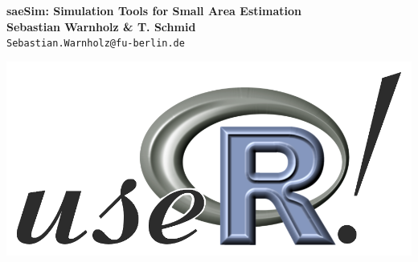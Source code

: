 \documentclass[a0,portrait]{a0poster}\usepackage[]{graphicx}\usepackage[]{color}
\begin{document}


\begin{minipage}[b]{0.75\linewidth}
\Huge \color{NavyBlue} \textbf{saeSim: Simulation Tools for Small Area Estimation} \color{Black}\\[0.5cm] %
\huge \textbf{ Sebastian Warnholz \& T. Schmid }\\[0.5cm] %
\Large \texttt{Sebastian.Warnholz@fu-berlin.de} \\
\end{minipage}
%
\begin{minipage}[b]{0.25\linewidth}
\hfill\includegraphics[width=0.9\linewidth]{logo.png}\\
\end{minipage}

\vspace{1cm} %

\end{document}
